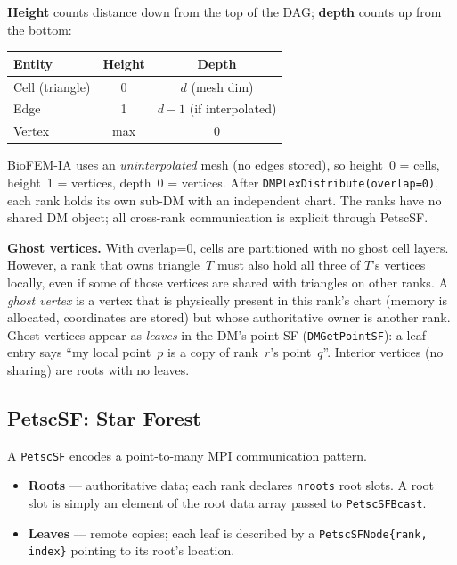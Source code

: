 \documentclass[11pt]{article}
\begin{document}
\textbf{Height} counts distance down from the top of the DAG; \textbf{depth} counts
up from the bottom:
\begin{center}
\begin{tabular}{lcc}
\toprule
Entity & Height & Depth \\
\midrule
Cell (triangle) & 0 & $d$ (mesh dim) \\
Edge & 1 & $d-1$ \quad (if interpolated) \\
Vertex & max & 0 \\
\bottomrule
\end{tabular}
\end{center}

BioFEM-IA uses an \emph{uninterpolated} mesh (no edges stored), so height~0 = cells,
height~1 = vertices, depth~0 = vertices.  After \texttt{DMPlexDistribute(overlap=0)},
each rank holds its own sub-DM with an independent chart.  The ranks have no shared
DM object; all cross-rank communication is explicit through PetscSF.

\textbf{Ghost vertices.}
With overlap=0, cells are partitioned with no ghost cell layers.  However,
a rank that owns triangle~$T$ must also hold all three of $T$'s vertices locally,
even if some of those vertices are shared with triangles on other ranks.  A
\emph{ghost vertex} is a vertex that is physically present in this rank's chart
(memory is allocated, coordinates are stored) but whose authoritative owner is
another rank.  Ghost vertices appear as \emph{leaves} in the DM's point SF
(\texttt{DMGetPointSF}): a leaf entry says ``my local point~$p$ is a copy of
rank~$r$'s point~$q$''.  Interior vertices (no sharing) are roots with no leaves.

\subsection{PetscSF: Star Forest}
\label{sec:sf}

A \texttt{PetscSF} encodes a point-to-many MPI communication pattern.

\begin{itemize}
  \item \textbf{Roots} --- authoritative data; each rank declares \texttt{nroots}
        root slots.  A root slot is simply an element of the root data array passed
        to \texttt{PetscSFBcast}.
  \item \textbf{Leaves} --- remote copies; each leaf is described by a
        \texttt{PetscSFNode\{rank, index\}} pointing to its root's location.
\end{itemize}
\end{document}
